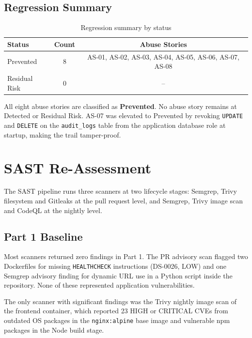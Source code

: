 \documentclass[12pt,a4paper]{report}
\begin{document}
\subsection{Regression Summary}

\begin{table}[H]
\centering
\caption{Regression summary by status}
\begin{tabular}{lcc}
\toprule
\textbf{Status} & \textbf{Count} & \textbf{Abuse Stories} \\
\midrule
Prevented      & 8 & AS-01, AS-02, AS-03, AS-04, AS-05, AS-06, AS-07, AS-08 \\
Residual Risk  & 0 & -- \\
\bottomrule
\end{tabular}
\end{table}

All eight abuse stories are classified as \textbf{Prevented}. No abuse story remains at
Detected or Residual Risk. AS-07 was elevated to Prevented by revoking \texttt{UPDATE} and
\texttt{DELETE} on the \texttt{audit\_logs} table from the application database role at
startup, making the trail tamper-proof.

\section{SAST Re-Assessment}

The SAST pipeline runs three scanners at two lifecycle stages: Semgrep, Trivy filesystem
and Gitleaks at the pull request level, and Semgrep, Trivy image scan and CodeQL at the
nightly level.

\subsection{Part 1 Baseline}

Most scanners returned zero findings in Part 1. The PR advisory scan flagged two Dockerfiles
for missing \texttt{HEALTHCHECK} instructions (DS-0026, LOW) and one Semgrep advisory finding
for dynamic URL use in a Python script inside the repository. None of these represented
application vulnerabilities.

The only scanner with significant findings was the Trivy nightly image scan of the frontend
container, which reported 23 HIGH or CRITICAL CVEs from outdated OS packages in the
\texttt{nginx:alpine} base image and vulnerable npm packages in the Node build stage.
\end{document}
